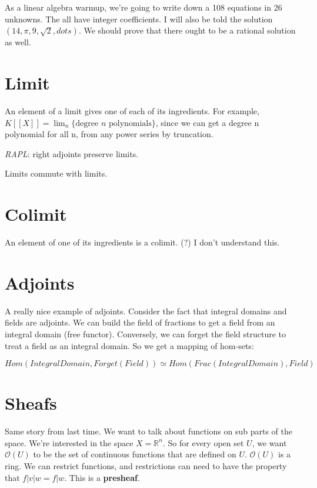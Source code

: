 \documentclass{book}
\renewcommand{\O}{\ensuremath{\mathcal{O}}}
\theoremstyle{definition}
\begin{document}
As a linear algebra warmup, we're going to write down a 108 equations
in 26 unknowns. The all have integer coefficients. I will also be told the solution
$(14, \pi, 9, \sqrt{2}, dots)$.  We should prove that there ought to be a
rational solution as well.

\section{Limit}

An element of a limit gives one of each of its ingredients. For example,
$K[[X]] = \lim_n \{ \text{degree $n$ polynomials} \}$, since we can get
a degree n polynomial for all n, from any power series by truncation.

\emph{RAPL}: right adjoints preserve limits.

Limits commute with limits.


\section{Colimit}

An element of one of its ingredients is a colimit. (?) I don't understand this.

\section{Adjoints}

A really nice example of adjoints. Consider the fact that integral domains
and fields are adjoints. We can build the field of fractions to get a field
from an integral domain (free functor). Conversely, we can forget the
field structure to treat a field as an integral domain. So we get a mapping
of hom-sets:

$$
Hom(IntegralDomain, Forget(Field)) \simeq Hom(Frac(IntegralDomain), Field)
$$

\section{Sheafs}

Same story from last time. We want to talk about functions on sub parts of the space.
We're interested in the space $X = \mathbb R^n$.
So for every open set $U$, we want $\O(U)$ to be the set of continuous
functions that are defined on $U$. $\O(U)$ is a ring. We can restrict functions,
and restrictions can need to have the property that $f|v|w = f|w$. This is
a \textbf{presheaf}.
\end{document}
